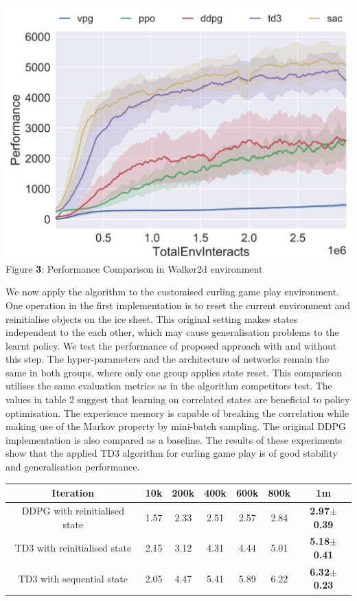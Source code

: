 \documentclass[oneside,11pt,a4paper]{article}
\begin{document}
\begin{center}
    \includegraphics[scale=.2]{pytorch_walker2d_performance.png}\\
    Figure \textbf{3}: Performance Comparison in Walker2d environment \cite{spinup}
\end{center}
\vspace{0.5cm}
\noindent
We now apply the algorithm to the customised curling game play environment. One operation in the first implementation is to reset the current environment and reinitialise objects on the ice sheet. This original setting makes states independent to the each other, which may cause generalisation problems to the learnt policy. We test the performance of proposed approach with and without this step. The hyper-parameters and the architecture of networks remain the same in both groups, where only one group applies state reset. This comparison utilises the same evaluation metrics as in the algorithm competitors test. The values in table 2 suggest that learning on correlated states are beneficial to policy optimisation. The experience memory is capable of breaking the correlation while making use of the Markov property by mini-batch sampling. The original DDPG implementation is also compared as a baseline.
\newline
\newline
\noindent
The results of these experiments show that the applied TD3 algorithm for curling game play is of good stability and generalisation performance.
\vspace{1cm}
\begin{center}
    \begin{tabular}{|c|c|c|c|c|c|c|}
    \hline
    Iteration & 10k & 200k & 400k & 600k & 800k & \textbf{1m} \\
    \hline
    DDPG with reinitialised state & 1.57 & 2.33 & 2.51 & 2.57 & 2.84 & \textbf{2.97$\pm$0.39} \\
    \hline
    TD3 with reinitialised state & 2.15 & 3.12 & 4.31 & 4.44 & 5.01 & \textbf{5.18$\pm$0.41} \\
    \hline
    TD3 with sequential state & 2.05 & 4.47 & 5.41 & 5.89 & 6.22 & \textbf{6.32$\pm$0.23} \\
    \hline
    \end{tabular}
\end{center}
\end{document}
